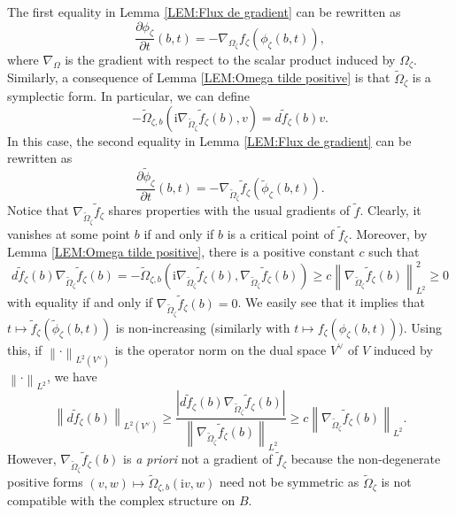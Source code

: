 \documentclass{article}
\theoremstyle{remark}
\theoremstyle{definition}
\renewcommand{\i}{\boldsymbol{\mathrm{i}}}
\newcommand{\abs}[1]{\left| #1 \right|}
\newcommand{\norme}[1]{\left\| #1 \right\|}
\renewcommand{\geq}{\geqslant}
\begin{document}
The first equality in Lemma \ref{LEM:Flux de gradient} can be rewritten as
$$
\frac{\partial\phi_\zeta}{\partial t}(b,t) = -\nabla_{\Omega_\zeta} f_\zeta(\phi_\zeta(b,t)),
$$
where $\nabla_\Omega$ is the gradient with respect to the scalar product induced by $\Omega_\zeta$. Similarly, a consequence of Lemma \ref{LEM:Omega tilde positive} is that $\tilde{\Omega}_\zeta$ is a symplectic form. In particular, we can define
$$
-\tilde{\Omega}_{\zeta,b}\left(\i\nabla_{\tilde{\Omega}_\zeta}\tilde{f}_\zeta(b),v\right) = d\tilde{f}_\zeta(b)v.
$$
In this case, the second equality in Lemma \ref{LEM:Flux de gradient} can be rewritten as
\begin{equation}\label{EQ:Flux de gradient}
    \frac{\partial\tilde{\phi}_\zeta}{\partial t}(b,t) = -\nabla_{\tilde{\Omega}_\zeta}\tilde{f}_\zeta(\tilde{\phi}_\zeta(b,t)).
\end{equation}
Notice that $\nabla_{\tilde{\Omega}_\zeta}\tilde{f}_\zeta$ shares properties with the usual gradients of $\tilde{f}$. Clearly, it vanishes at some point $b$ if and only if $b$ is a critical point of $\tilde{f}_\zeta$. Moreover, by Lemma \ref{LEM:Omega tilde positive}, there is a positive constant $c$ such that
\begin{equation}\label{EQ:Norme gradient tilde}
    d\tilde{f}_\zeta(b)\nabla_{\tilde{\Omega}_\zeta}\tilde{f}_\zeta(b) = -\tilde{\Omega}_{\zeta,b}(\i\nabla_{\tilde{\Omega}_\zeta}\tilde{f}_\zeta(b),\nabla_{\tilde{\Omega}_\zeta}\tilde{f}_\zeta(b)) \geq c\norme{\nabla_{\tilde{\Omega}_\zeta}\tilde{f}_\zeta(b)}_{L^2}^2 \geq 0
\end{equation}
with equality if and only if $\nabla_{\tilde{\Omega}_\zeta}\tilde{f}_\zeta(b) = 0$. We easily see that it implies that $t \mapsto \tilde{f}_\zeta(\tilde{\phi}_\zeta(b,t))$ is non-increasing (similarly with $t \mapsto f_\zeta(\phi_\zeta(b,t))$). Using this, if $\norme{\cdot}_{L^2(V^\lor)}$ is the operator norm on the dual space $V^\lor$ of $V$ induced by $\norme{\cdot}_{L^2}$, we have
\begin{equation}\label{EQ:Equivalence normes gradients}
    \norme{d\tilde{f}_\zeta(b)}_{L^2(V^\lor)} \geq \frac{\abs{d\tilde{f}_\zeta(b)\nabla_{\tilde{\Omega}_\zeta}\tilde{f}_\zeta(b)}}{\norme{\nabla_{\tilde{\Omega}_\zeta}\tilde{f}_\zeta(b)}_{L^2}} \geq c\norme{\nabla_{\tilde{\Omega}_\zeta}\tilde{f}_\zeta(b)}_{L^2}.
\end{equation}
However, $\nabla_{\tilde{\Omega}_\zeta}\tilde{f}_\zeta(b)$ is \textit{a priori} not a gradient of $\tilde{f}_\zeta$ because the non-degenerate positive forms $(v,w) \mapsto \tilde{\Omega}_{\zeta,b}(\i v,w)$ need not be symmetric as $\tilde{\Omega}_\zeta$ is not compatible with the complex structure on $B$.
\end{document}
